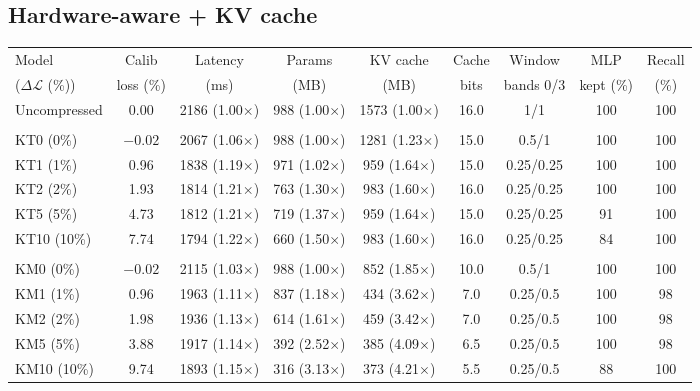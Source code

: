 \documentclass[11pt]{article}
\newcommand{\dloss}{\Delta\mathcal{L}}
\begin{document}
\clearpage
\subsection{Hardware-aware + KV cache}

\begin{table}[!ht]
\centering
\scriptsize
\setlength{\tabcolsep}{3pt}
\begin{tabular}{lcccccccc}
\toprule
Model & Calib & Latency & Params & KV cache & Cache & Window & MLP & Recall \\
($\dloss$ (\%)) & loss (\%) & (ms) & (MB) & (MB) & bits & bands 0/3 & kept (\%) & (\%) \\
\midrule
Uncompressed & 0.00 & 2186 (1.00$\times$) & 988 (1.00$\times$) & 1573 (1.00$\times$) & 16.0 & 1/1 & 100 & 100 \\
\addlinespace
\multicolumn{9}{l}{\emph{Fastest within the level}} \\
KT0 (0\%) & $-0.02$ & 2067 (1.06$\times$) & 988 (1.00$\times$) & 1281 (1.23$\times$) & 15.0 & 0.5/1 & 100 & 100 \\
KT1 (1\%) & 0.96 & 1838 (1.19$\times$) & 971 (1.02$\times$) & 959 (1.64$\times$) & 15.0 & 0.25/0.25 & 100 & 100 \\
KT2 (2\%) & 1.93 & 1814 (1.21$\times$) & 763 (1.30$\times$) & 983 (1.60$\times$) & 16.0 & 0.25/0.25 & 100 & 100 \\
KT5 (5\%) & 4.73 & 1812 (1.21$\times$) & 719 (1.37$\times$) & 959 (1.64$\times$) & 15.0 & 0.25/0.25 & 91 & 100 \\
KT10 (10\%) & 7.74 & 1794 (1.22$\times$) & 660 (1.50$\times$) & 983 (1.60$\times$) & 16.0 & 0.25/0.25 & 84 & 100 \\
\addlinespace
\multicolumn{9}{l}{\emph{Least memory within the level}} \\
KM0 (0\%) & $-0.02$ & 2115 (1.03$\times$) & 988 (1.00$\times$) & 852 (1.85$\times$) & 10.0 & 0.5/1 & 100 & 100 \\
KM1 (1\%) & 0.96 & 1963 (1.11$\times$) & 837 (1.18$\times$) & 434 (3.62$\times$) & 7.0 & 0.25/0.5 & 100 & 98 \\
KM2 (2\%) & 1.98 & 1936 (1.13$\times$) & 614 (1.61$\times$) & 459 (3.42$\times$) & 7.0 & 0.25/0.5 & 100 & 98 \\
KM5 (5\%) & 3.88 & 1917 (1.14$\times$) & 392 (2.52$\times$) & 385 (4.09$\times$) & 6.5 & 0.25/0.5 & 100 & 98 \\
KM10 (10\%) & 9.74 & 1893 (1.15$\times$) & 316 (3.13$\times$) & 373 (4.21$\times$) & 5.5 & 0.25/0.5 & 88 & 100 \\

\end{tabular}
\end{table}
\end{document}
